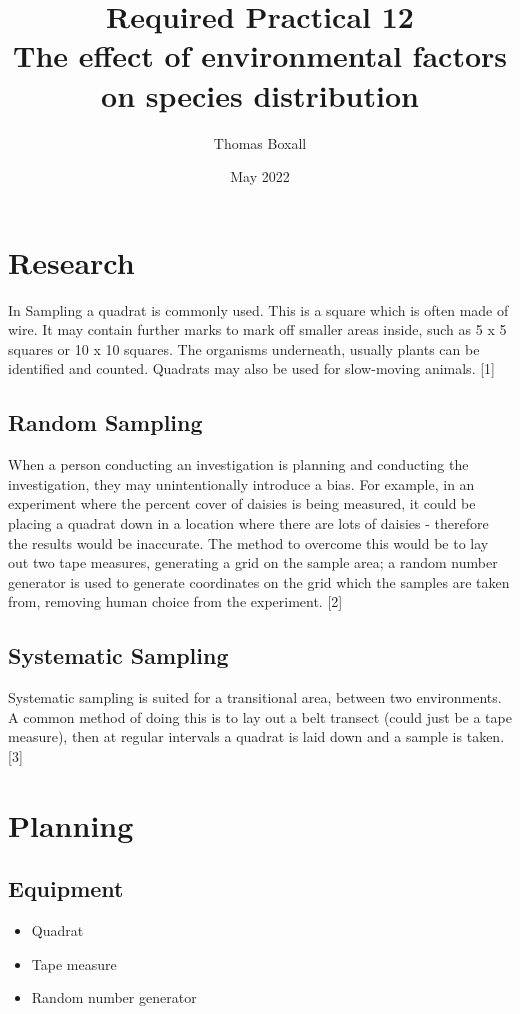 \documentclass{thomasClass}
\title{\textbf{Required Practical 12}
\\The effect of environmental factors on species distribution
}
\author{Thomas Boxall}
\date{May 2022}
\begin{document}
\maketitle
\section{Research}
In Sampling a quadrat is commonly used. This is a square which is often made of wire. It may contain further marks to mark off smaller areas inside, such as 5 x 5 squares or 10 x 10 squares. The organisms underneath, usually plants can be identified and counted. Quadrats may also be used for slow-moving animals. [1]
\subsection{Random Sampling}
When a person conducting an investigation is planning and conducting the investigation, they may unintentionally introduce a bias. For example, in an experiment where the percent cover of daisies is being measured, it could be placing a quadrat down in a location where there are lots of daisies - therefore the results would be inaccurate. The method to overcome this would be to lay out two tape measures, generating a grid on the sample area; a random number generator is used to generate coordinates on the grid which the samples are taken from, removing human choice from the experiment. [2]
\subsection{Systematic Sampling}
Systematic sampling is suited for a transitional area, between two environments. A common method of doing this is to lay out a belt transect (could just be a tape measure), then at regular intervals a quadrat is laid down and a sample is taken. [3]

\section{Planning}
\subsection{Equipment}
\begin{itemize}
    \item Quadrat
    \item Tape measure
    \item Random number generator
\end{itemize}
\end{document}

